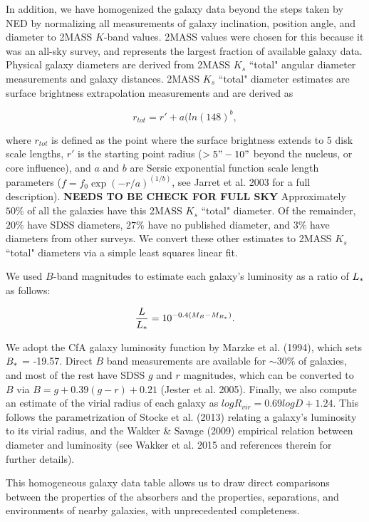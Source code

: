 \documentclass[iop]{emulateapj-rtx4}
\begin{document}
In addition, we have homogenized the galaxy data beyond the steps taken by NED by normalizing all measurements of galaxy inclination, position angle, and diameter to 2MASS $K$-band values. 2MASS values were chosen for this because it was an all-sky survey, and represents the largest fraction of available galaxy data. Physical galaxy diameters are derived from 2MASS $K_s$ ``total" angular diameter measurements and galaxy distances. 2MASS $K_s$ ``total" diameter estimates are surface brightness extrapolation measurements and are derived as 

\begin{equation}
r_{tot} = r' + a(ln(148)^b,
\end{equation}

\noindent where $r_{tot}$ is defined as the point where the surface brightness extends to 5 disk scale lengths, $r'$ is the starting point radius ($>5" - 10"$ beyond the nucleus, or core influence), and $a$ and $b$ are Sersic exponential function scale length parameters ($f = f_0 \exp{(-r/a)}^{(1/b)}$, see Jarret et al. 2003 for a full description). \textbf{NEEDS TO BE CHECK FOR FULL SKY} Approximately $50\%$ of all the galaxies have this 2MASS $K_s$ ``total" diameter. Of the remainder, $20\%$ have SDSS diameters, $27\%$ have no published diameter, and $3\%$ have diameters from other surveys. We convert these other estimates to 2MASS $K_s$ ``total" diameters via a simple least squares linear fit. 

We used $B$-band magnitudes to estimate each galaxy's luminosity as a ratio of $L_{\**}$ as follows:

\begin{equation}
	\frac{L}{L_{\**}} = 10^{-0.4 (M_{B} - M_{B_{\**}})}. 
\end{equation}

We adopt the CfA galaxy luminosity function by Marzke et al. (1994), which sets $B_{\**} $ = -19.57. Direct $B$ band measurements are available for $\sim 30\%$ of galaxies, and most of the rest have SDSS $g$ and $r$ magnitudes, which can be converted to $B$ via $B = g + 0.39 (g-r) + 0.21$ (Jester et al. 2005). Finally, we also compute an estimate of the virial radius of each galaxy as $log R_{vir} = 0.69 log D + 1.24$. This follows the parametrization of Stocke et al. (2013) relating a galaxy's luminosity to its virial radius, and the Wakker $\&$ Savage (2009) empirical relation between diameter and luminosity (see Wakker et al. 2015 and references therein for further details).

This homogeneous galaxy data table allows us to draw direct comparisons between the properties of the absorbers and the properties, separations, and environments of nearby galaxies, with unprecedented completeness.
\end{document}
